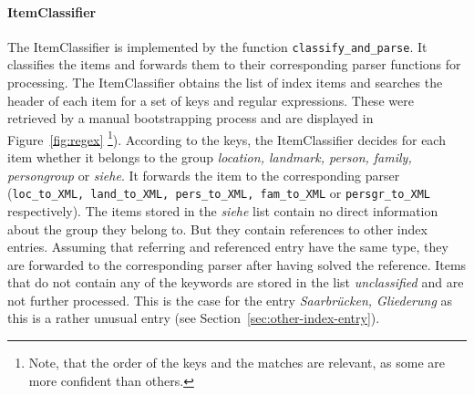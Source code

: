 \paragraph{ItemClassifier}
\label{sec:classifier}
The ItemClassifier is implemented by the function \texttt{classify\_and\_parse}. It classifies the items and forwards them to their corresponding parser functions for processing. The ItemClassifier obtains the list of index items and searches the header of each item for a set of keys and regular expressions. These were retrieved by a manual bootstrapping process and are displayed in Figure~\ref{fig:regex} \footnote{Note, that the order of the keys and the matches are relevant, as some are more confident than others.}). According to the keys, the ItemClassifier decides for each item whether it belongs to the group \textit{location, landmark, person, family, persongroup} or \textit{siehe}. It forwards the item to the corresponding parser (\texttt{loc\_to\_XML, land\_to\_XML, pers\_to\_XML, fam\_to\_XML} or \texttt{persgr\_to\_XML} respectively). The items stored in the \textit{siehe} list contain no direct information about the group they belong to. But they contain references to other index entries. Assuming that referring and referenced entry have the same type, they are forwarded to the corresponding parser after having solved the reference. Items that do not contain any of the keywords are stored in the list \textit{unclassified} and are not further processed. This is the case for the entry \textit{Saarbrücken, Gliederung} as this is a rather unusual entry (see Section~\ref{sec:other-index-entry}).

